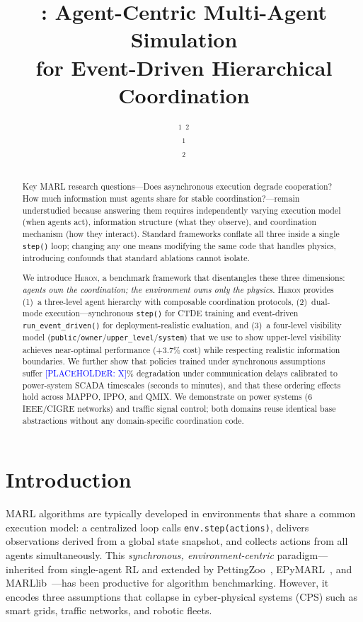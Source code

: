 \documentclass{article}
\title{\heron{}: Agent-Centric Multi-Agent Simulation\\for Event-Driven Hierarchical Coordination}
\author{
  \placeholder{Author Name}$^{1}$ \quad
  \placeholder{Author Name}$^{2}$ \\
  $^{1}$\placeholder{Institution 1} \\
  $^{2}$\placeholder{Institution 2} \\
  \texttt{\placeholder{email@institution.edu}}
}
\newcommand{\heron}{\textsc{Heron}}
\newcommand{\placeholder}[1]{\textcolor{blue}{[PLACEHOLDER: #1]}}
\begin{document}
\maketitle

\begin{abstract}
Key MARL research questions---Does asynchronous execution degrade cooperation? How much information must agents share for stable coordination?---remain understudied because answering them requires independently varying execution model (when agents act), information structure (what they observe), and coordination mechanism (how they interact). Standard frameworks conflate all three inside a single \texttt{step()} loop; changing any one means modifying the same code that handles physics, introducing confounds that standard ablations cannot isolate.

We introduce \heron{}, a benchmark framework that disentangles these three dimensions: \emph{agents own the coordination; the environment owns only the physics}. \heron{} provides (1)~a three-level agent hierarchy with composable coordination protocols, (2)~dual-mode execution---synchronous \texttt{step()} for CTDE training and event-driven \texttt{run\_event\_driven()} for deployment-realistic evaluation, and (3)~a four-level visibility model (\texttt{public}/\texttt{owner}/\texttt{upper\_level}/\texttt{system}) that we use to show upper-level visibility achieves near-optimal performance (+3.7\% cost) while respecting realistic information boundaries. We further show that policies trained under synchronous assumptions suffer \placeholder{X}\% degradation under communication delays calibrated to power-system SCADA timescales (seconds to minutes), and that these ordering effects hold across MAPPO, IPPO, and QMIX. We demonstrate on power systems (6 IEEE/CIGRE networks) and traffic signal control; both domains reuse identical base abstractions without any domain-specific coordination code.
\end{abstract}

\section{Introduction}
\label{sec:intro}

MARL algorithms are typically developed in environments that share a common execution model: a centralized loop calls \texttt{env.step(actions)}, delivers observations derived from a global state snapshot, and collects actions from all agents simultaneously. This \emph{synchronous, environment-centric} paradigm---inherited from single-agent RL and extended by PettingZoo~\cite{terry2021pettingzoo}, EPyMARL~\cite{papoudakis2021benchmarking}, and MARLlib~\cite{hu2023marllib}---has been productive for algorithm benchmarking. However, it encodes three assumptions that collapse in cyber-physical systems (CPS) such as smart grids, traffic networks, and robotic fleets.
\end{document}
